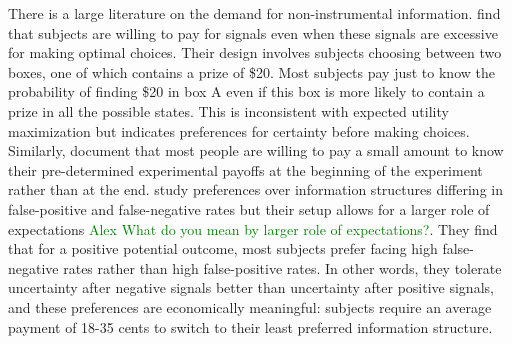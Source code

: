 \documentclass[12pt,a4paper]{article}
\begin{document}
There is a large literature on the demand for non-instrumental information. \citet{eliaz_paying_2010} find that subjects are willing to pay for signals even when these signals are excessive for making optimal choices. Their design involves subjects choosing between two boxes, one of which contains a prize of \$20. Most subjects pay just to know the probability of finding \$20 in box A even if this box is more likely to contain a prize in all the possible states. This is inconsistent with expected utility maximization but indicates preferences for certainty before making choices.  Similarly, \citet{ganguly_fantasy_2017} document that most people are willing to pay a small amount to know their pre-determined experimental payoffs at the beginning of the experiment rather than at the end.  \citet{masatlioglu_intrinsic_2017} study preferences over information structures differing in false-positive and false-negative rates but their setup allows for a larger role of expectations \textcolor{green}{\@ Alex What do you mean by larger role of expectations?}. They find that for a positive potential outcome, most subjects prefer facing high false-negative rates rather than high false-positive rates. In other words, they tolerate uncertainty after negative signals better than uncertainty after positive signals, and these preferences are economically meaningful: subjects require an average payment of 18-35 cents to switch to their least preferred information structure.

\end{document}
